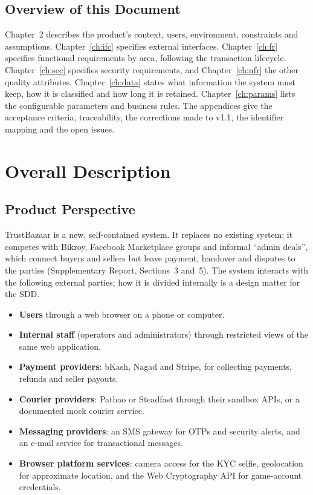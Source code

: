 \documentclass[11pt,a4paper]{report}
\begin{document}
\section{Overview of this Document}
Chapter~2 describes the product's context, users, environment, constraints and assumptions. Chapter~\ref{ch:ifc} specifies external interfaces. Chapter~\ref{ch:fr} specifies functional requirements by area, following the transaction lifecycle. Chapter~\ref{ch:sec} specifies security requirements, and Chapter~\ref{ch:nfr} the other quality attributes. Chapter~\ref{ch:data} states what information the system must keep, how it is classified and how long it is retained. Chapter~\ref{ch:params} lists the configurable parameters and business rules. The appendices give the acceptance criteria, traceability, the corrections made to v1.1, the identifier mapping and the open issues.

\chapter{Overall Description}

\section{Product Perspective}
TrustBazaar is a new, self-contained system. It replaces no existing system; it competes with Bikroy, Facebook Marketplace groups and informal ``admin deals'', which connect buyers and sellers but leave payment, handover and disputes to the parties (Supplementary Report, Sections~3 and~5). The system interacts with the following external parties; how it is divided internally is a design matter for the SDD.
\begin{itemize}[nosep]
    \item \textbf{Users} through a web browser on a phone or computer.
    \item \textbf{Internal staff} (operators and administrators) through restricted views of the same web application.
    \item \textbf{Payment providers}: bKash, Nagad and Stripe, for collecting payments, refunds and seller payouts.
    \item \textbf{Courier providers}: Pathao or Steadfast through their sandbox APIs, or a documented mock courier service.
    \item \textbf{Messaging providers}: an SMS gateway for OTPs and security alerts, and an e-mail service for transactional messages.
    \item \textbf{Browser platform services}: camera access for the KYC selfie, geolocation for approximate location, and the Web Cryptography API for game-account credentials.
\end{itemize}
\end{document}
